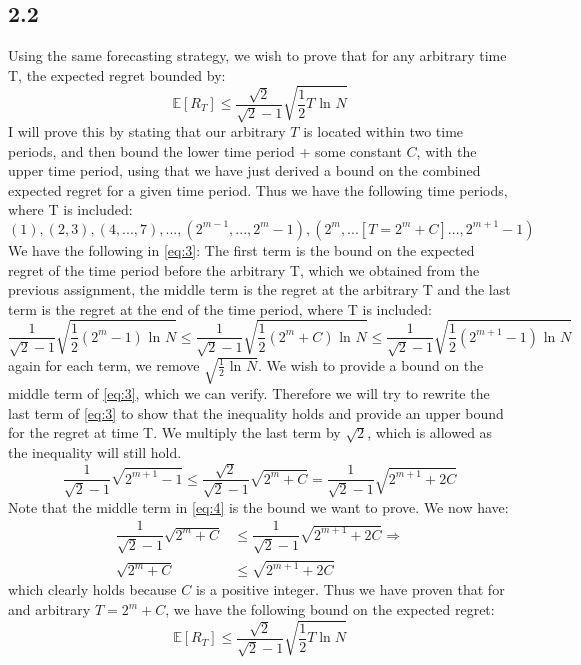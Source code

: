\documentclass{article}
\begin{document}
\subsection{2.2}
Using the same forecasting strategy, we wish to prove that for any arbitrary time T, the expected regret bounded by:
\begin{equation}
\mathbb{E}[R_T] \leq \dfrac{\sqrt{2}}{\sqrt{2}-1}\sqrt{\dfrac{1}{2} T \text{ ln }N}
\end{equation}
I will prove this by stating that our arbitrary $T$ is located within two time periods, and then bound the lower time period + some constant $C$, with the upper time period, using that we have just derived a bound on the combined expected regret for a given time period. Thus we have the following time periods, where T is included:
\begin{equation}
(1),(2,3),(4,...,7),...,(2^{m-1},...,2^{m}-1),(2^{m},...[T=2^m + C]...,2^{m+1}-1)
\end{equation}
We have the following in \eqref{eq:3}: The first term is the bound on the expected regret of the time period before the arbitrary T, which we obtained from the previous assignment, the middle term is the regret at the arbitrary T and the last term is the regret at the end of the time period, where T is included:
\begin{equation}
\label{eq:3}
\dfrac{1}{\sqrt{2}-1}\sqrt{\dfrac{1}{2} (2^m-1) \text{ ln }N} \leq
\dfrac{1}{\sqrt{2}-1}\sqrt{\dfrac{1}{2} (2^m + C) \text{ ln }N}
\leq \dfrac{1}{\sqrt{2}-1}\sqrt{\dfrac{1}{2} (2^{m+1}-1) \text{ ln }N}
\end{equation}
again for each term, we remove $\sqrt{\frac{1}{2} \text{ ln } N}$. We wish to provide a bound on the middle term of \eqref{eq:3}, which we can verify. Therefore we will try to rewrite the last term of \eqref{eq:3} to show that the inequality holds and provide an upper bound for the regret at time T. We multiply the last term by $\sqrt{2}$, which is allowed as the inequality will still hold.
\begin{equation}
\label{eq:4}
\dfrac{1}{\sqrt{2}-1}\sqrt{ 2^{m+1}-1} \leq \dfrac{ \sqrt{2} }{\sqrt{2}-1}\sqrt{ 2^{m}+C} = \dfrac{1}{\sqrt{2}-1}\sqrt{2^{m+1} + 2C}
\end{equation}
Note that the middle term in \eqref{eq:4} is the bound we want to prove. We now have:
\begin{align}
\dfrac{1}{\sqrt{2}-1}\sqrt{ 2^m + C } &\leq \dfrac{1}{\sqrt{2}-1}\sqrt{2^{m+1} + 2C} \Rightarrow \\
\sqrt{ 2^m + C } &\leq \sqrt{2^{m+1} + 2C}
\end{align}
which clearly holds because $C$ is a positive integer.
Thus we have proven that for and arbitrary $T=2^m +C$, we have the following bound on the expected regret:
\begin{equation}
\mathbb{E}[R_T] \leq \dfrac{\sqrt{2}}{\sqrt{2}-1}\sqrt{\dfrac{1}{2} T \ln N }
\end{equation}
\end{document}
